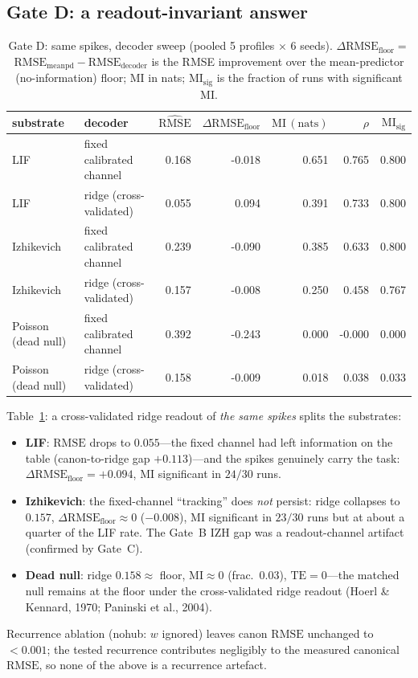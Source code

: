\documentclass[12pt]{article}
\begin{document}
\subsection{Gate D: a readout-invariant answer}\label{sec:gatedres}
\begin{table}[H]
\centering
\caption{Gate D: same spikes, decoder sweep (pooled 5 profiles
$\times$ 6 seeds). $\Delta\mathrm{RMSE}_{\mathrm{floor}}=$ $\mathrm{RMSE}_{\mathrm{meanpd}}-
\mathrm{RMSE}_{\mathrm{decoder}}$ is the RMSE improvement over the
mean-predictor (no-information) floor; $\mathrm{MI}$ in nats;
$\mathrm{MI}_{\mathrm{sig}}$ is the fraction of runs with significant $\mathrm{MI}$.}
\label{tab:gated}
\begin{tabular}{llrrrrr}
\toprule
substrate & decoder & $\widehat{\mathrm{RMSE}}$ & $\Delta\mathrm{RMSE}_{\mathrm{floor}}$ & $\mathrm{MI}\,\mathrm{(nats)}$ & $\rho$ & $\mathrm{MI}_{\mathrm{sig}}$ \\
\midrule
LIF & fixed calibrated channel & 0.168 & -0.018 & 0.651 & 0.765 & 0.800 \\
LIF & ridge (cross-validated) & 0.055 & 0.094 & 0.391 & 0.733 & 0.800 \\
Izhikevich & fixed calibrated channel & 0.239 & -0.090 & 0.385 & 0.633 & 0.800 \\
Izhikevich & ridge (cross-validated) & 0.157 & -0.008 & 0.250 & 0.458 & 0.767 \\
Poisson (dead null) & fixed calibrated channel & 0.392 & -0.243 & 0.000 & -0.000 & 0.000 \\
Poisson (dead null) & ridge (cross-validated) & 0.158 & -0.009 & 0.018 & 0.038 & 0.033 \\
\bottomrule
\end{tabular}
\end{table}
Table~\ref{tab:gated}: a cross-validated ridge readout of
\emph{the same spikes} splits the substrates:
\begin{itemize}[nosep]
\item \textbf{LIF}: $\mathrm{RMSE}$ drops to $0.055$---the fixed channel had
left information on the table (canon-to-ridge gap $+0.113$)---and the
spikes genuinely carry the task: $\Delta\mathrm{RMSE}_{\mathrm{floor}}=+0.094$, $\mathrm{MI}$ significant in
$24/30$ runs.
\item \textbf{Izhikevich}: the fixed-channel ``tracking'' does
\emph{not} persist: ridge collapses to $0.157$, $\Delta\mathrm{RMSE}_{\mathrm{floor}}\approx0$
($-0.008$), $\mathrm{MI}$ significant in $23/30$ runs but at about a quarter
of the LIF rate. The Gate~B IZH gap was a readout-channel artifact
(confirmed by Gate~C).
\item \textbf{Dead null}: ridge $0.158\approx$ floor, $\mathrm{MI}\approx0$
(frac.\ $0.03$), $\mathrm{TE}=0$---the matched null remains at the floor under
the cross-validated ridge readout (Hoerl \& Kennard, 1970; Paninski et al., 2004).
\end{itemize}
Recurrence ablation (nohub: $w$ ignored) leaves canon $\mathrm{RMSE}$ unchanged
to $<0.001$; the tested recurrence contributes negligibly to the
measured canonical $\mathrm{RMSE}$, so none of the above is a recurrence
artefact.
\end{document}

